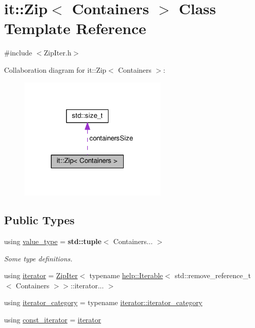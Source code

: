 \hypertarget{classit_1_1Zip}{}\section{it\+:\+:Zip$<$ Containers $>$ Class Template Reference}
\label{classit_1_1Zip}


{\ttfamily \#include $<$Zip\+Iter.\+h$>$}



Collaboration diagram for it\+:\+:Zip$<$ Containers $>$\+:\nopagebreak
\begin{figure}[H]
\begin{center}
\leavevmode
\includegraphics[width=202pt]{classit_1_1Zip__coll__graph}
\end{center}
\end{figure}
\subsection*{Public Types}
\begin{DoxyCompactItemize}
\item 
using \hyperlink{classit_1_1Zip_a9baa8c30fff173711c97c3341c28ea3b}{value\+\_\+type} = {\bf std\+::tuple}$<$ Containers... $>$
\begin{DoxyCompactList}\small\item\em Some type definitions. \end{DoxyCompactList}\item 
using \hyperlink{classit_1_1Zip_a6f4a405b96cce4346e1a34522031366a}{iterator} = \hyperlink{classit_1_1ZipIter}{Zip\+Iter}$<$ typename \hyperlink{structit_1_1help_1_1Iterable}{help\+::\+Iterable}$<$ std\+::remove\+\_\+reference\+\_\+t$<$ Containers $>$$>$\+::iterator... $>$
\item 
using \hyperlink{classit_1_1Zip_a88b8c5f4b882a3318c6819a16277f07a}{iterator\+\_\+category} = typename \hyperlink{classit_1_1ZipIter_a0b1ee44643a34f21062bfd17c873331f}{iterator\+::iterator\+\_\+category}
\item 
using \hyperlink{classit_1_1Zip_ac9c7dacbb33c23f586cb8886fdd58275}{const\+\_\+iterator} = \hyperlink{classit_1_1Zip_a6f4a405b96cce4346e1a34522031366a}{iterator}
\end{DoxyCompactItemize}
